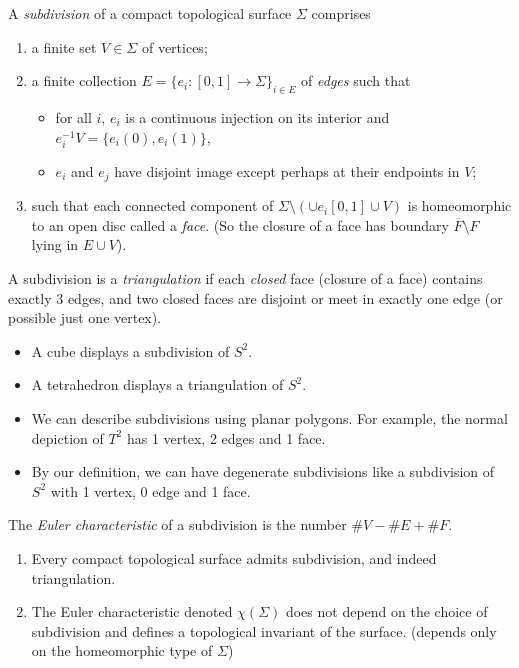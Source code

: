 \leavevmode
\begin{definition}
    A \textit{subdivision} of a compact topological surface \(\Sigma\) comprises
    \begin{enumerate}
        \item a finite set \(V \in \Sigma\) of vertices;
        \item a finite collection \(E = \{e_i: [0,1] \to \Sigma\}_{i\in E}\) of \textit{edges} such that
        \begin{itemize}
            \item for all \(i\), \(e_i\) is a continuous injection on its interior and \(e_i^{-1}V = \{e_i(0),e_i(1)\}\),
            \item \(e_i\) and \(e_j\) have disjoint image except perhaps at their endpoints in \(V\);
        \end{itemize}
        \item such that each connected component of \(\Sigma \setminus (\cup e_i[0,1]\cup V)\) is homeomorphic to an open disc called a \textit{face}. (So the closure of a face has boundary \(\overline{F}\setminus F\) lying in \(E\cup V\)).
    \end{enumerate}

    A subdivision is a \textit{triangulation} if each \textit{closed} face (closure of a face) contains exactly 3 edges, and two closed faces are disjoint or meet in exactly one edge (or possible just one vertex).
\end{definition}
\begin{example}
    \leavevmode
    \begin{itemize}
        \item A cube displays a subdivision of \(S^2\).
        \item A tetrahedron displays a triangulation of \(S^2\).
        \item We can describe subdivisions using planar polygons. For example, the normal depiction of \(T^2\) has 1 vertex, 2 edges and 1 face.
        \item By our definition, we can have degenerate subdivisions like a subdivision of \(S^2\) with 1 vertex, 0 edge and 1 face.
    \end{itemize}
\end{example}
\begin{definition}
    The \textit{Euler characteristic} of a subdivision is the number \(\# V - \# E + \# F\).
\end{definition}
\begin{theorem}
    \leavevmode
    \begin{enumerate}
        \item Every compact topological surface admits subdivision, and indeed triangulation.
        \item The Euler characteristic denoted \(\chi (\Sigma)\) does not depend on the choice of subdivision and defines a topological invariant of the surface. (depends only on the homeomorphic type of \(\Sigma\))
    \end{enumerate}
\end{theorem}
